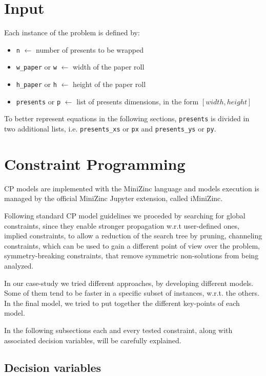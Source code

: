 \documentclass[a4paper,10pt]{article}
\begin{document}
\section{Input}
Each instance of the problem is defined by:
\begin{itemize}
   \item \texttt{n} $\longleftarrow$ number of presents to be wrapped
   \item \texttt{w\_paper} or \texttt{w} $\longleftarrow$ width of the paper roll
   \item \texttt{h\_paper} or \texttt{h} $\longleftarrow$ height of the paper roll
   \item \texttt{presents} or \texttt{p} $\longleftarrow$ list of presents dimensions, in the form $[width,height]$
\end{itemize}

To better represent equations in the following sections, \texttt{presents} is divided in two additional lists, i.e. \texttt{presents\_xs} or \texttt{px} and \texttt{presents\_ys} or \texttt{py}.

\section{Constraint Programming}
CP models are implemented with the MiniZinc language and models execution is managed by the official MiniZinc Jupyter extension, called iMiniZinc.

Following standard CP model guidelines we proceded by searching for global constraints, since they enable stronger propagation w.r.t user-defined ones, implied constraints, to allow a reduction of the search tree by pruning, channeling constraints, which can be used to gain a different point of view over the problem, symmetry-breaking constraints, that remove symmetric non-solutions from being analyzed.

In our case-study we tried different approaches, by developing different models. Some of them tend to be faster in a specific subset of instances, w.r.t. the others. In the final model, we tried to put together the different key-points of each model.

In the following subsections each and every tested constraint, along with associated decision variables, will be carefully explained.

\subsection{Decision variables} \label {sec:cp-variables}
\end{document}
